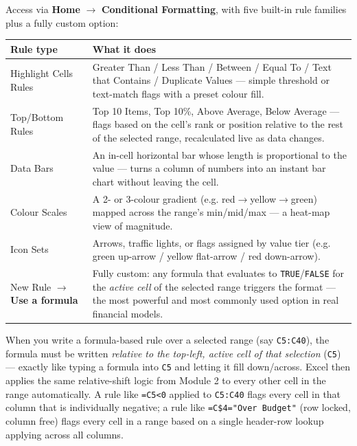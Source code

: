 \documentclass[11pt,a4paper]{article}
\begin{document}
Access via \textbf{Home} $\rightarrow$ \textbf{Conditional Formatting}, with five built-in rule families plus a fully custom option:

\begin{center}
\begin{tabular}{@{}L{3.4cm}L{9.4cm}@{}}
\toprule
\textbf{Rule type} & \textbf{What it does} \\
\midrule
Highlight Cells Rules & Greater Than / Less Than / Between / Equal To / Text that Contains / Duplicate Values --- simple threshold or text-match flags with a preset colour fill. \\
Top/Bottom Rules & Top 10 Items, Top 10\%, Above Average, Below Average --- flags based on the cell's rank or position relative to the rest of the selected range, recalculated live as data changes. \\
Data Bars & An in-cell horizontal bar whose length is proportional to the value --- turns a column of numbers into an instant bar chart without leaving the cell. \\
Colour Scales & A 2- or 3-colour gradient (e.g. red$\to$yellow$\to$green) mapped across the range's min/mid/max --- a heat-map view of magnitude. \\
Icon Sets & Arrows, traffic lights, or flags assigned by value tier (e.g. green up-arrow / yellow flat-arrow / red down-arrow). \\
New Rule $\rightarrow$ \textbf{Use a formula} & Fully custom: any formula that evaluates to \texttt{TRUE}/\texttt{FALSE} for the \emph{active cell} of the selected range triggers the format --- the most powerful and most commonly used option in real financial models. \\
\bottomrule
\end{tabular}
\end{center}

\begin{formulasyntax}
When you write a formula-based rule over a selected range (say \texttt{C5:C40}), the formula must be written \emph{relative to the top-left, active cell of that selection} (\texttt{C5}) --- exactly like typing a formula into \texttt{C5} and letting it fill down/across. Excel then applies the same relative-shift logic from Module 2 to every other cell in the range automatically. A rule like \texttt{=C5<0} applied to \texttt{C5:C40} flags every cell in that column that is individually negative; a rule like \texttt{=C\$4="Over Budget"} (row locked, column free) flags every cell in a range based on a single header-row lookup applying across all columns.
\end{formulasyntax}
\end{document}
